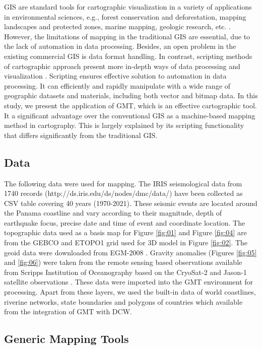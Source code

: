\documentclass[USenglish,twocolumn]{article}
\begin{document}
GIS are standard tools for cartographic visualization in a variety of applications in environmental sciences, e.g., forest conservation and deforestation, mapping landscapes and protected zones, marine mapping, geologic research, etc. \cite{Harper,Pelletier,Lemenkova202135,Rucker}. However, the limitations of mapping in the traditional GIS are essential, due to the lack of automation in data processing. Besides, an open problem in the existing commercial GIS is data format handling. In contrast, scripting methods of cartographic approach present more in-depth ways of data processing and visualization \cite{1405673,Lemenkova202213}. Scripting ensures effective solution to automation in data processing. It can efficiently and rapidly manipulate with a wide range of geographic datasets and materials, including both vector and bitmap data. In this study, we present the application of GMT, which is an effective cartographic tool. It a significant advantage over the conventional GIS as a machine-based mapping method in cartography. This is largely explained by its scripting functionality that differs significantly from the traditional GIS. 

\subsection{Data}
The following data were used for mapping. The IRIS seismological data from 1740 records (http://ds.iris.edu/ds/nodes/dmc/data/) have been collected as CSV table covering 40 years (1970-2021). These seismic events are located around the Panama coastline and vary according to their magnitude, depth of earthquake focus, precise date and time of event and coordinate location. The topographic data used as a basis map for Figure \ref{fig:01} and Figure \ref{fig:04} are from the GEBCO \cite{GEBCO,Schenke2016} and ETOPO1 grid \cite{Amante} used for 3D model in Figure \ref{fig:02}. The geoid data were downloaded from EGM-2008 \cite{Pavlis}. Gravity anomalies (Figures \ref{fig:05} and \ref{fig:06}) were taken from the remote sensing based observations available from Scripps Institution of Oceanography based on the CryoSat-2 and Jason-1 satellite observations \cite{Sandwell}. These data were imported into the GMT environment for processing. Apart from these layers, we used the built-in data of world coastlines, riverine networks, state boundaries and polygons of countries which available from the integration of GMT with DCW.

\subsection{Generic Mapping Tools} 
\end{document}

